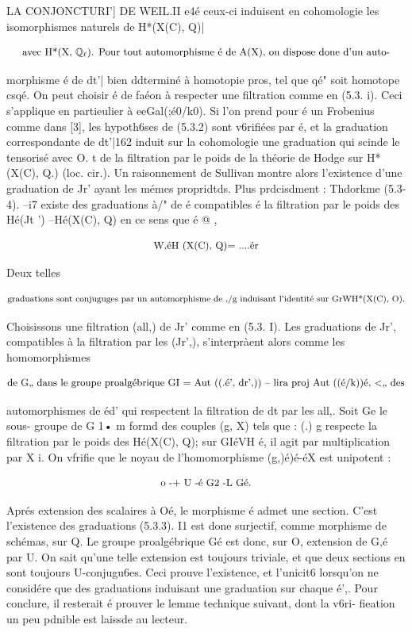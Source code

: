 \documentclass[11pt]{article}
\theoremstyle{remark}
\begin{document}
LA CONJONCTURI'] DE WEIL.II e4é ceux-ci induisent en cohomologie les isomorphismes naturels de H*(X(C), Q)|

\[\text{\small avec H*(X, \(\mathbb{Q}_{\ell}\)). Pour tout automorphisme é de A(X), on dispose done d'un auto-}\]

morphisme é de dt'| bien ddterminé à homotopie pros, tel que qé" soit homotope csqé. On peut choisir é de faéon à respecter une filtration comme en (5.3. i). Ceci s'applique en partieulier à eeGal(;é0/k0). Si l'on prend pour é un Frobenius comme dans [3], les hypoth6ses de (5.3.2) sont v6rifiées par é, et la graduation correspondante de dt'|162 induit sur la cohomologie une graduation qui scinde le tensorisé avec O. t de la filtration par le poids de la théorie de Hodge sur H*(X(C), Q.) (loc. cir.). Un raisonnement de Sullivan montre alors l'existence d'une graduation de Jr' ayant les mémes propridtds. Plus prdcisdment : Thdorkme (5.3-4). --i7 existe des graduations à/" de é compatibles é la filtration par le poids des Hé(Jt ') --Hé(X(C), Q) en ce sens que é @ ,

\[\text{\small W,éH (X(C), Q)= ....ér}\]

Deux telles

\[\text{\small graduations sont conjuguges par un automorphisme de ,/g induisant l'identité sur GrWH*(X(C), O).}\]

Choisissons une filtration (all,) de Jr' comme en (5.3. I). Les graduations de Jr', compatibles à la filtration par les (Jr',), s'interpràent alors comme les homomorphismes

\[\text{\small de G,, dans le groupe proalgébrique GI = Aut ((.é', dr',)) -- lira proj Aut ((é/k))é, <,, des}\]

automorphismes de éd' qui respectent la filtration de dt par les all,. Soit Ge le sous- groupe de G 1• m formd des couples (g, X) tels que : (.) g respecte la filtration par le poids des Hé(X(C), Q); sur GIéVH é, il agit par multiplication par X i. On vfrifie que le noyau de l'homomorphisme (g,)é)é-éX est unipotent :

\[\text{\small o -+ U -é G2 -L Gé.}\]

Aprés extension des scalaires à Oé, le morphisme é admet une section. C'est l'existence des graduations (5.3.3). I1 est done surjectif, comme morphisme de schémas, sur Q. Le groupe proalgébrique Gé est donc, sur O, extension de G,é par U. On sait qu'une telle extension est toujours triviale, et que deux sections en sont toujours U-conjugu6es. Ceci prouve l'existence, et l'unicit6 lorsqu'on ne considére que des graduations induisant une graduation sur chaque é',. Pour conclure, il resterait é prouver le lemme technique suivant, dont la v6ri- fieation un peu pdnible est laissde au lecteur.
\end{document}

